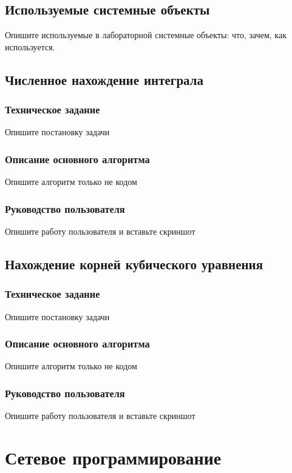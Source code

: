 \documentclass[a4paper,14pt]{extarticle}
\begin{document}
\subsection{Используемые системные объекты}
Опишите используемые в лабораторной системные объекты: что, зачем, как используется.

\subsection{Численное нахождение интеграла}
\subsubsection{Техническое задание}
Опишите постановку задачи

\subsubsection{Описание основного алгоритма}
Опишите алгоритм только не кодом

\subsubsection{Руководство пользователя}
Опишите работу пользователя и вставьте скриншот

\subsection{Нахождение корней кубического уравнения}
\subsubsection{Техническое задание}
Опишите постановку задачи

\subsubsection{Описание основного алгоритма}
Опишите алгоритм только не кодом

\subsubsection{Руководство пользователя}
Опишите работу пользователя и вставьте скриншот
\newpage

\section{Сетевое программирование}
\end{document}
